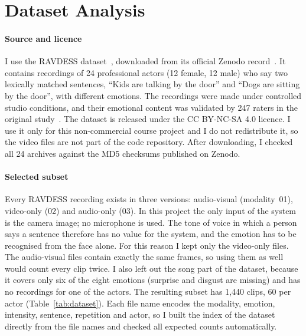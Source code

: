 
\section{Dataset Analysis}\label{sec:dataset}

\paragraph{Source and licence}
I use the RAVDESS dataset~\cite{ravdess}, downloaded from its official Zenodo record~\cite{ravdesszenodo}. It contains recordings of 24 professional actors (12 female, 12 male) who say two lexically matched sentences, ``Kids are talking by the door'' and ``Dogs are sitting by the door'', with different emotions. The recordings were made under controlled studio conditions, and their emotional content was validated by 247 raters in the original study~\cite{ravdess}. The dataset is released under the CC BY-NC-SA 4.0 licence. I use it only for this non-commercial course project and I do not redistribute it, so the video files are not part of the code repository. After downloading, I checked all 24 archives against the MD5 checksums published on Zenodo.

\paragraph{Selected subset}
Every RAVDESS recording exists in three versions: audio-visual (modality~01), video-only (02) and audio-only (03). In this project the only input of the system is the camera image; no microphone is used. The tone of voice in which a person says a sentence therefore has no value for the system, and the emotion has to be recognised from the face alone. For this reason I kept only the video-only files. The audio-visual files contain exactly the same frames, so using them as well would count every clip twice. I also left out the song part of the dataset, because it covers only six of the eight emotions (surprise and disgust are missing) and has no recordings for one of the actors. The resulting subset has 1,440 clips, 60 per actor (Table~\ref{tab:dataset}). Each file name encodes the modality, emotion, intensity, sentence, repetition and actor, so I built the index of the dataset directly from the file names and checked all expected counts automatically.

